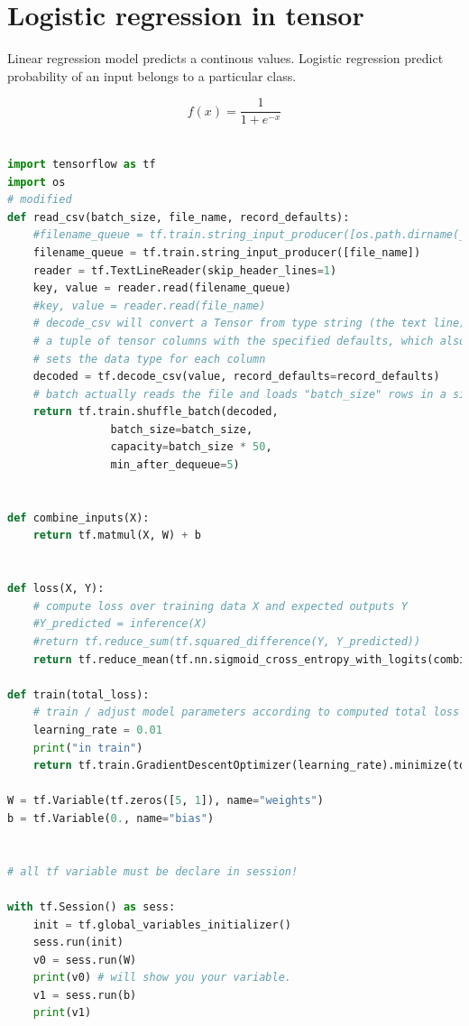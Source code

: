 \documentclass[vecarrow]{svproc}
\begin{document}
\section{Logistic regression in tensor}

Linear regression model predicts a continous values. Logistic regression predict
probability of an input belongs to a particular class.

\begin{equation}
  f(x) = \frac{1}{1 + e^{-x}}
\end{equation}

\begin{lstlisting}[language=Python,
caption={logistic regression in tensor},label={list8}]

import tensorflow as tf
import os
# modified
def read_csv(batch_size, file_name, record_defaults):
    #filename_queue = tf.train.string_input_producer([os.path.dirname(__file__) + "/" + file_name])
    filename_queue = tf.train.string_input_producer([file_name])
    reader = tf.TextLineReader(skip_header_lines=1)
    key, value = reader.read(filename_queue)
    #key, value = reader.read(file_name)
    # decode_csv will convert a Tensor from type string (the text line) in
    # a tuple of tensor columns with the specified defaults, which also
    # sets the data type for each column
    decoded = tf.decode_csv(value, record_defaults=record_defaults)
    # batch actually reads the file and loads "batch_size" rows in a single tensor
    return tf.train.shuffle_batch(decoded,
                batch_size=batch_size,
                capacity=batch_size * 50,
                min_after_dequeue=5)


def combine_inputs(X):
    return tf.matmul(X, W) + b


def loss(X, Y):
    # compute loss over training data X and expected outputs Y
    #Y_predicted = inference(X)
    #return tf.reduce_sum(tf.squared_difference(Y, Y_predicted))
    return tf.reduce_mean(tf.nn.sigmoid_cross_entropy_with_logits(combine_inputs(X), Y))

def train(total_loss):
    # train / adjust model parameters according to computed total loss
    learning_rate = 0.01
    print("in train")
    return tf.train.GradientDescentOptimizer(learning_rate).minimize(total_loss)

W = tf.Variable(tf.zeros([5, 1]), name="weights")
b = tf.Variable(0., name="bias")


# all tf variable must be declare in session!

with tf.Session() as sess:
    init = tf.global_variables_initializer()
    sess.run(init)
    v0 = sess.run(W)    
    print(v0) # will show you your variable.
    v1 = sess.run(b)
    print(v1)
    

\end{lstlisting}
\end{document}
